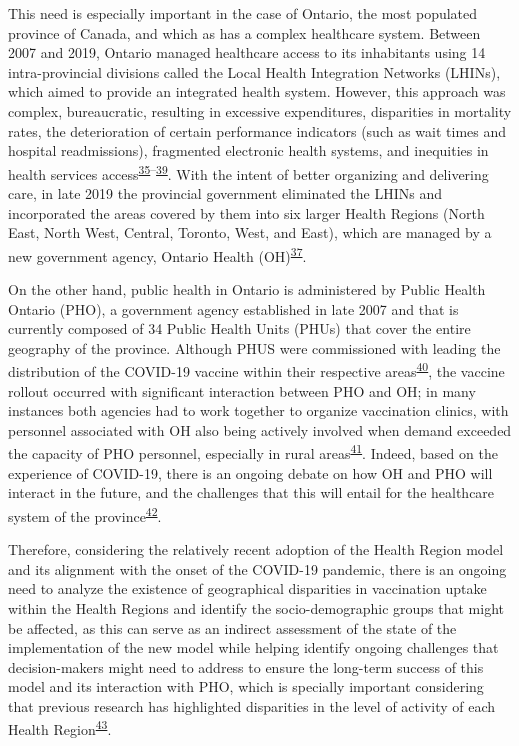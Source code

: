 \documentclass[
]{article}
\begin{document}
This need is especially important in the case of Ontario, the most
populated province of Canada, and which as has a complex healthcare
system. Between 2007 and 2019, Ontario managed healthcare access to its
inhabitants using 14 intra-provincial divisions called the Local Health
Integration Networks (LHINs), which aimed to provide an integrated
health system. However, this approach was complex, bureaucratic,
resulting in excessive expenditures, disparities in mortality rates, the
deterioration of certain performance indicators (such as wait times and
hospital readmissions), fragmented electronic health systems, and
inequities in health services
access\textsuperscript{\protect\hyperlink{ref-tsasis2012}{35}--\protect\hyperlink{ref-lysyk2016}{39}}.
With the intent of better organizing and delivering care, in late 2019
the provincial government eliminated the LHINs and incorporated the
areas covered by them into six larger Health Regions (North East, North
West, Central, Toronto, West, and East), which are managed by a new
government agency, Ontario Health
(OH)\textsuperscript{\protect\hyperlink{ref-dong2022}{37}}.

On the other hand, public health in Ontario is administered by Public
Health Ontario (PHO), a government agency established in late 2007 and
that is currently composed of 34 Public Health Units (PHUs) that cover
the entire geography of the province. Although PHUS were commissioned
with leading the distribution of the COVID-19 vaccine within their
respective
areas\textsuperscript{\protect\hyperlink{ref-rotenberg2021}{40}}, the
vaccine rollout occurred with significant interaction between PHO and
OH; in many instances both agencies had to work together to organize
vaccination clinics, with personnel associated with OH also being
actively involved when demand exceeded the capacity of PHO personnel,
especially in rural
areas\textsuperscript{\protect\hyperlink{ref-ashcroft2023}{41}}. Indeed,
based on the experience of COVID-19, there is an ongoing debate on how
OH and PHO will interact in the future, and the challenges that this
will entail for the healthcare system of the
province\textsuperscript{\protect\hyperlink{ref-dion2022}{42}}.

Therefore, considering the relatively recent adoption of the Health
Region model and its alignment with the onset of the COVID-19 pandemic,
there is an ongoing need to analyze the existence of geographical
disparities in vaccination uptake within the Health Regions and identify
the socio-demographic groups that might be affected, as this can serve
as an indirect assessment of the state of the implementation of the new
model while helping identify ongoing challenges that decision-makers
might need to address to ensure the long-term success of this model and
its interaction with PHO, which is specially important considering that
previous research has highlighted disparities in the level of activity
of each Health
Region\textsuperscript{\protect\hyperlink{ref-sethuram2023}{43}}.
\end{document}
